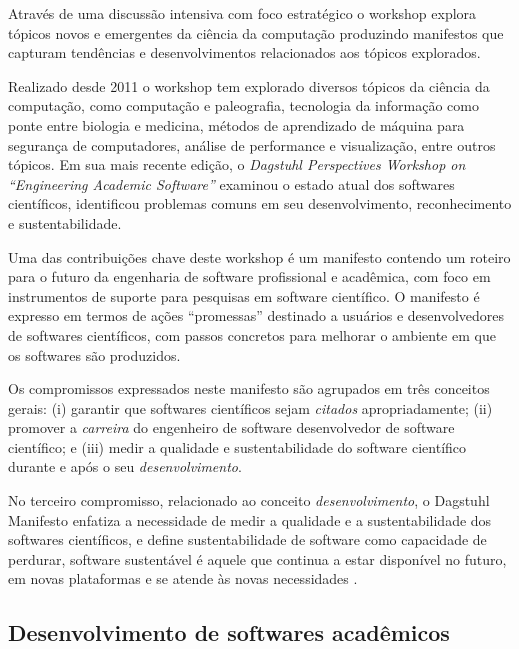 Através de uma discussão intensiva com foco estratégico o workshop explora
tópicos novos e emergentes da ciência da computação produzindo manifestos que
capturam tendências e desenvolvimentos relacionados aos tópicos explorados.

Realizado desde 2011 o workshop tem explorado diversos tópicos da ciência da
computação, como computação e paleografia, tecnologia da informação como ponte
entre biologia e medicina, métodos de aprendizado de máquina para segurança de
computadores, análise de performance e visualização, entre outros tópicos. Em
sua mais recente edição, o {\it Dagstuhl Perspectives Workshop on ``Engineering
Academic Software''} \cite{allen2017engineering} examinou o estado atual dos
softwares científicos, identificou problemas comuns em seu desenvolvimento,
reconhecimento e sustentabilidade.

Uma das contribuições chave deste workshop é um manifesto contendo um roteiro
para o futuro da engenharia de software profissional e acadêmica, com foco em
instrumentos de suporte para pesquisas em software científico. O manifesto é
expresso em termos de ações ``promessas'' destinado a usuários e
desenvolvedores de softwares científicos, com passos concretos para melhorar o
ambiente em que os softwares são produzidos.

Os compromissos expressados neste manifesto são agrupados em três conceitos gerais:
(i) garantir que softwares científicos sejam {\it citados} apropriadamente;
(ii) promover a {\it carreira} do engenheiro de software desenvolvedor de software científico; e
(iii) medir a qualidade e sustentabilidade do software científico durante e após o seu {\it desenvolvimento}.

No terceiro compromisso, relacionado ao conceito {\it desenvolvimento}, o Dagstuhl Manifesto enfatiza a necessidade de medir a
qualidade e a sustentabilidade dos softwares científicos, e define
sustentabilidade de software como capacidade de perdurar, software sustentável
é aquele que continua a estar disponível no futuro, em novas plataformas e se
atende às novas necessidades \cite{allen2017engineering}.

\subsection{Desenvolvimento de softwares acadêmicos}

%

